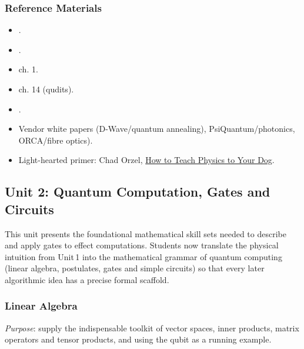 \subsubsection{Reference Materials}
\begin{itemize}
	\item \citeauthor{Preskill:2023} .
	\item \citeauthor{Feynman:1986} .
	\item \citeauthor{Nielsen:2010}  ch. 1.
	\item \citeauthor{Lipton:2021}  ch. 14 (qudits).
	\item \citeauthor{Monroe:2021} .
	\item Vendor white papers (D-Wave/quantum annealing), PsiQuantum/photonics, ORCA/fibre optics).
	\item Light-hearted primer: Chad Orzel, \href{https://chadorzel.com/?cat=4}{How to Teach Physics to Your Dog}.
\end{itemize}

\subsection{Unit 2: Quantum Computation, Gates and Circuits}

This unit presents the foundational mathematical skill sets needed to describe and apply gates to effect computations. 
Students now translate the physical intuition from Unit 1 into the mathematical grammar of quantum computing
(linear algebra, postulates, gates and simple circuits) so that every later algorithmic idea has a precise formal scaffold.

\subsubsection{Linear Algebra}

\emph{Purpose}: supply the indispensable toolkit of vector spaces, inner products, matrix operators and tensor products,
and using the qubit as a running example.

